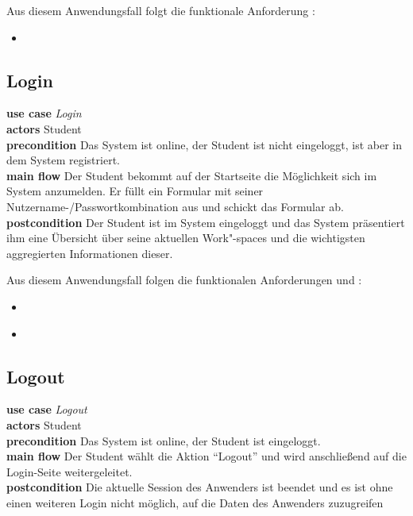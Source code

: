 Aus diesem Anwendungsfall folgt die funktionale Anforderung :
\begin{itemize}
 \item \requirement{\requirementRegistrieren}\label{requirementRegistrieren}
\end{itemize}
 
\subsection{Login}
\textbf{use case} \emph{Login}\\
\textbf{actors} Student\\
\textbf{precondition} Das System ist online, der Student ist nicht eingeloggt, ist aber in dem System registriert.\\
\textbf{main flow} Der Student bekommt auf der Startseite die Möglichkeit sich im System anzumelden. Er füllt ein Formular mit seiner Nutzername-/Passwortkombination aus und schickt das Formular ab.\\
\textbf{postcondition} Der Student ist im System eingeloggt und das System präsentiert ihm eine Übersicht über seine aktuellen Work"-spaces und die wichtigsten aggregierten Informationen dieser.
 
Aus diesem Anwendungsfall folgen die funktionalen Anforderungen  und :
\begin{itemize}
 \item \requirement{\requirementLogin}\label{requirementLogin}
 \item \requirement{\requirementZugriffAufEigeneWidgets}\label{requirementZugriffAufEigeneWidgets}
\end{itemize}

\subsection{Logout}
\textbf{use case} \emph{Logout}\\
\textbf{actors} Student\\
\textbf{precondition} Das System ist online, der Student ist eingeloggt.\\
\textbf{main flow} Der Student wählt die Aktion "`Logout"' und wird anschließend auf die Login-Seite weitergeleitet.\\
\textbf{postcondition} Die aktuelle Session des Anwenders ist beendet und es ist ohne einen weiteren Login nicht möglich, auf die Daten des Anwenders zuzugreifen 
 
